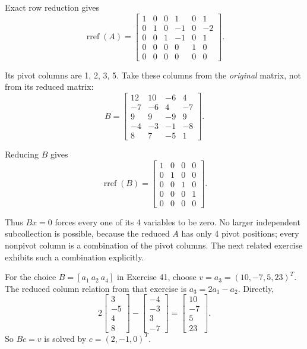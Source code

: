 Exact row reduction gives
\[ \operatorname{rref}(A)=\begin{bmatrix}1 & 0 & 0 & 1 & 0 & 1\\0 & 1 & 0 & -1 & 0 & -2\\0 & 0 & 1 & -1 & 0 & 1\\0 & 0 & 0 & 0 & 1 & 0\\0 & 0 & 0 & 0 & 0 & 0\end{bmatrix}.\]

Its pivot columns are 1, 2, 3, 5. Take these columns from the \emph{original} matrix, not from its reduced matrix:
\[ B=\begin{bmatrix}12 & 10 & -6 & 4\\-7 & -6 & 4 & -7\\9 & 9 & -9 & 9\\-4 & -3 & -1 & -8\\8 & 7 & -5 & 1\end{bmatrix}.\]

Reducing $B$ gives
\[ \operatorname{rref}(B)=\begin{bmatrix}1 & 0 & 0 & 0\\0 & 1 & 0 & 0\\0 & 0 & 1 & 0\\0 & 0 & 0 & 1\\0 & 0 & 0 & 0\end{bmatrix}.\]

Thus $Bx=0$ forces every one of its 4 variables to be zero. No larger independent subcollection is possible, because the reduced $A$ has only 4 pivot positions; every nonpivot column is a combination of the pivot columns. The next related exercise exhibits such a combination explicitly.


For the choice $B=[a_1\ a_2\ a_4]$ in Exercise 41, choose
$v=a_3=(10,-7,5,23)^T$. The reduced column relation from that
exercise is $a_3=2a_1-a_2$. Directly,
\[
 2\begin{bmatrix}3\\-5\\4\\8\end{bmatrix}
 -\begin{bmatrix}-4\\-3\\3\\-7\end{bmatrix}
 =\begin{bmatrix}10\\-7\\5\\23\end{bmatrix}.
\]
So $Bc=v$ is solved by $c=(2,-1,0)^T$.

